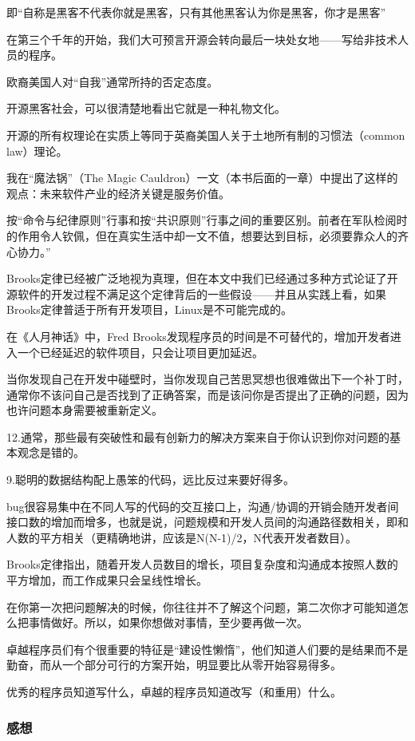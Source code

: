 即“自称是黑客不代表你就是黑客，只有其他黑客认为你是黑客，你才是黑客”

在第三个千年的开始，我们大可预言开源会转向最后一块处女地——写给非技术人员的程序。

欧裔美国人对“自我”通常所持的否定态度。

开源黑客社会，可以很清楚地看出它就是一种礼物文化。

开源的所有权理论在实质上等同于英裔美国人关于土地所有制的习惯法（common law）理论。

我在“魔法锅”（The Magic Cauldron）一文（本书后面的一章）中提出了这样的观点：未来软件产业的经济关键是服务价值。

按“命令与纪律原则”行事和按“共识原则”行事之间的重要区别。前者在军队检阅时的作用令人钦佩，但在真实生活中却一文不值，想要达到目标，必须要靠众人的齐心协力。”

Brooks定律已经被广泛地视为真理，但在本文中我们已经通过多种方式论证了开源软件的开发过程不满足这个定律背后的一些假设——并且从实践上看，如果Brooks定律普适于所有开发项目，Linux是不可能完成的。

在《人月神话》中，Fred Brooks发现程序员的时间是不可替代的，增加开发者进入一个已经延迟的软件项目，只会让项目更加延迟。

当你发现自己在开发中碰壁时，当你发现自己苦思冥想也很难做出下一个补丁时，通常你不该问自己是否找到了正确答案，而是该问你是否提出了正确的问题，因为也许问题本身需要被重新定义。

12.通常，那些最有突破性和最有创新力的解决方案来自于你认识到你对问题的基本观念是错的。

9.聪明的数据结构配上愚笨的代码，远比反过来要好得多。

bug很容易集中在不同人写的代码的交互接口上，沟通/协调的开销会随开发者间接口数的增加而增多，也就是说，问题规模和开发人员间的沟通路径数相关，即和人数的平方相关（更精确地讲，应该是N(N-1)/2，N代表开发者数目）。

Brooks定律指出，随着开发人员数目的增长，项目复杂度和沟通成本按照人数的平方增加，而工作成果只会呈线性增长。

在你第一次把问题解决的时候，你往往并不了解这个问题，第二次你才可能知道怎么把事情做好。所以，如果你想做对事情，至少要再做一次。

卓越程序员们有个很重要的特征是“建设性懒惰”，他们知道人们要的是结果而不是勤奋，而从一个部分可行的方案开始，明显要比从零开始容易得多。

优秀的程序员知道写什么，卓越的程序员知道改写（和重用）什么。

\subsubsection{感想}

